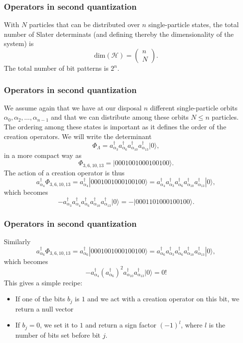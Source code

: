 \documentclass{beamer}
\begin{document}
\begin{frame}
\frametitle{Operators in second quantization}

\begin{block}{}
With $N$ particles that can be distributed over $n$ single-particle states, the total number of Slater determinats (and defining thereby the dimensionality of the system) is
\[
\mathrm{dim}(\mathcal{H}) = \left(\begin{array}{c} n \\N\end{array}\right).
\]
The total number of bit patterns is $2^n$. 
\end{block}
\end{frame}

\begin{frame}
\frametitle{Operators in second quantization}

\begin{block}{}
We assume again that we have at our disposal $n$ different single-particle orbits
$\alpha_0,\alpha_2,\dots,\alpha_{n-1}$ and that we can distribute  among these orbits $N\le n$ particles.
The ordering among these states is important as it defines the order of the creation operators.
We will write the determinant 
\[
\Phi_{\Lambda} = a_{\alpha_3}^{\dagger} a_{\alpha_6}^{\dagger} a_{\alpha_{10}}^{\dagger} a_{\alpha_{13}}^{\dagger} |0\rangle,
\]
in a more compact way as 
\[
\Phi_{3,6,10,13} = |0001001000100100\rangle.
\]
The action of a creation operator is thus
\[
a^{\dagger}_{\alpha_4}\Phi_{3,6,10,13} = a^{\dagger}_{\alpha_4}|0001001000100100\rangle=a^{\dagger}_{\alpha_4}a_{\alpha_3}^{\dagger} a_{\alpha_6}^{\dagger} a_{\alpha_{10}}^{\dagger} a_{\alpha_{13}}^{\dagger} |0\rangle,
\]
which becomes
\[
-a_{\alpha_3}^{\dagger} a^{\dagger}_{\alpha_4} a_{\alpha_6}^{\dagger} a_{\alpha_{10}}^{\dagger} a_{\alpha_{13}}^{\dagger} |0\rangle=-|0001101000100100\rangle.
\]
\end{block}
\end{frame}

\begin{frame}
\frametitle{Operators in second quantization}

\begin{block}{}
Similarly
\[
a^{\dagger}_{\alpha_6}\Phi_{3,6,10,13} = a^{\dagger}_{\alpha_6}|0001001000100100\rangle=a^{\dagger}_{\alpha_6}a_{\alpha_3}^{\dagger} a_{\alpha_6}^{\dagger} a_{\alpha_{10}}^{\dagger} a_{\alpha_{13}}^{\dagger} |0\rangle,
\]
which becomes
\[
-a^{\dagger}_{\alpha_4} (a_{\alpha_6}^{\dagger})^ 2 a_{\alpha_{10}}^{\dagger} a_{\alpha_{13}}^{\dagger} |0\rangle=0!
\]
This gives a simple recipe:  
\begin{itemize}
\item If one of the bits $b_j$ is $1$ and we act with a creation operator on this bit, we return a null vector

\item If $b_j=0$, we set it to $1$ and return a sign factor $(-1)^l$, where $l$ is the number of bits set before bit $j$.
\end{itemize}

\noindent
\end{block}
\end{frame}
\end{document}
